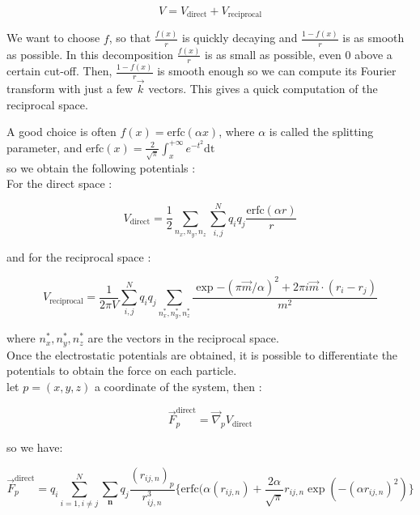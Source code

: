 \documentclass[10pt,twoside,a4paper]{report}
\begin{document}
\begin{equation}
    V = V_{\text{direct}} + V_{\text{reciprocal}}
\end{equation}

We want to choose $f$, so that $\frac{f(x)}{r}$ is quickly decaying and $\frac{1 - f(x)}{r}$ is as smooth as possible. In this decomposition $\frac{f(x)}{r}$  is as small as possible, even $0$ above a certain cut-off. Then, $\frac{1-f(x)}{r}$ is smooth enough so we can compute its Fourier transform with just a few $\overrightarrow{k}$ vectors. This gives a quick computation of the reciprocal space.

A good choice is often $f(x) = \text{erfc}(\alpha x)$, where $\alpha$ is called the splitting parameter, and $\text{erfc}(x) = \frac{2}{\sqrt{\pi}} \int_{x}^{+\infty}{e^{-t^2}\text{dt}} $\\

so we obtain the following potentials :\\

For the direct space :

\begin{equation}
   V_{\text{direct}} =  \frac{1}{2} \sum_{n_x,n_y,n_z} \sum_{i,j}^{N} q_i q_j \frac{\text{erfc}(\alpha r)}{r}
\end{equation}

and for the reciprocal space :

\begin{equation}
\label{Vrecip}
	V_{\text{reciprocal}} = \frac{1}{2 \pi V} \sum_{i,j}^{N} q_i q_j \sum_{n_x^*,n_y^*,n_z^*}\frac{\exp{-(\pi \overrightarrow{m}/\alpha)^2} +2\pi i \overrightarrow{m} \cdot (r_i - r_j)}{m^2}
\end{equation}

where $n_x^*,n_y^*,n_z^*$ are the vectors in the reciprocal space.\\


Once the electrostatic potentials are obtained, it is possible to differentiate the potentials to obtain the force on each particle.\\

let $p = (x,y,z)$ a coordinate of the system, then :


\begin{equation}
   \overrightarrow{F}_p^{\text{direct}} = \overrightarrow{\nabla}_p V_{\text{direct}} 
\end{equation}


so we have:

\begin{equation}
\label{ewaldDirect}
   \overrightarrow{F}_p^{\text{direct}} = q_i \sum\limits_{i=1,i\neq j}^N \sum\limits_{\textbf{n}} q_j \frac{(r_{ij,n})_p}{r_{ij,n}^3}
   \{\text{erfc}(\alpha (r_{ij,n}) + \frac{2\alpha}{\sqrt{\pi}} r_{ij,n} \exp(-(\alpha r_{ij,n})^2)\}
\end{equation}
\end{document}
